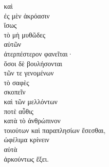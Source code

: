 {\large
\begin{greek}
\noindent καὶ \\
ἐς μὲν ἀκρόασιν \\
ἴσως \\
τὸ μὴ μυθῶδες \\
\tabto{2em} αὐτῶν \\
ἀτερπέστερον φανεῖται·\\
ὅσοι δὲ βουλήσονται \\
\tabto{2em} τῶν τε γενομένων\\
\tabto{4em} τὸ σαφὲς \\
\tabto{4em} σκοπεῖν \\
\tabto{2em} καὶ τῶν μελλόντων \\
\tabto{4em} ποτὲ αὖθις \\
\tabto{4em} κατὰ τὸ ἀνθρώπινον \\
\tabto{4em} τοιούτων καὶ παραπλησίων ἔσεσθαι, \\
\tabto{2em} ὠφέλιμα κρίνειν \\
\tabto{2em} αὐτὰ \\
ἀρκούντως ἕξει.\\

\end{greek}
}

